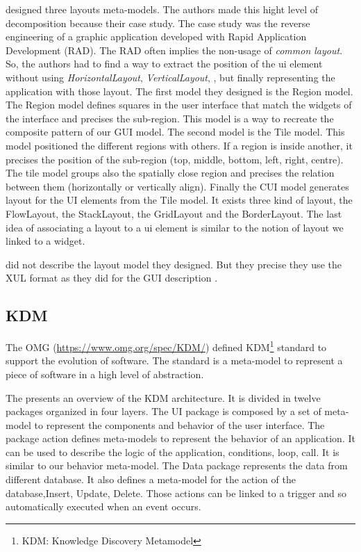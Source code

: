 \documentclass[conference]{IEEEtran}
\begin{document}
\citet{sanchez2014model} designed three layouts meta-models.
The authors made this hight level of decomposition because their case study.
The case study was the reverse engineering of a graphic application developed
    with Rapid Application Development (RAD).
The RAD often implies the non-usage of \textit{common layout}.
So, the authors had to find a way to extract the position of the ui element
    without using \textit{HorizontalLayout}, \textit{VerticalLayout}, \etc, but
    finally representing the application with those layout.
The first model they designed is the Region model.
The Region model defines squares in the user interface that match the widgets of the interface
    and precises the sub-region.
This model is a way to recreate the composite pattern of our GUI model.
The second model is the Tile model.
This model positioned the different regions with others.
If a region is inside another, it precises the position of the sub-region (top, middle, bottom, left, right, centre).
The tile model groups also the spatially close region and precises the relation between them (horizontally or vertically align).
Finally the CUI model generates layout for the UI elements from the Tile model.
It exists three kind of layout, the FlowLayout, the StackLayout, the GridLayout and the BorderLayout.
The last idea of associating a layout to a ui element is similar to the notion of layout we linked to a widget.


\citet{samir2007swing2script} did not describe the layout model they designed.
But they precise they use the XUL format as they did for the GUI description .


\subsection{KDM}
\label{sec:kdm}


The OMG (\url{https://www.omg.org/spec/KDM/}) defined KDM\footnote{KDM: Knowledge Discovery Metamodel} standard to support the evolution of software.
The standard is a meta-model to represent a piece of software in a high level of abstraction.


The  presents an overview of the KDM architecture.
It is divided in twelve packages organized in four layers.
The UI package is composed by a set of meta-model to represent
    the components and behavior of the user interface.
The package action defines meta-models to represent the behavior of an application.
It can be used to describe the logic of the application, \eg conditions, loop, call.
It is similar to our behavior meta-model.
The Data package represents the data from different database.
It also defines a meta-model for the action of the database,\eg Insert, Update, Delete.
Those actions can be linked to a trigger and so automatically executed when an event occurs.
\end{document}
